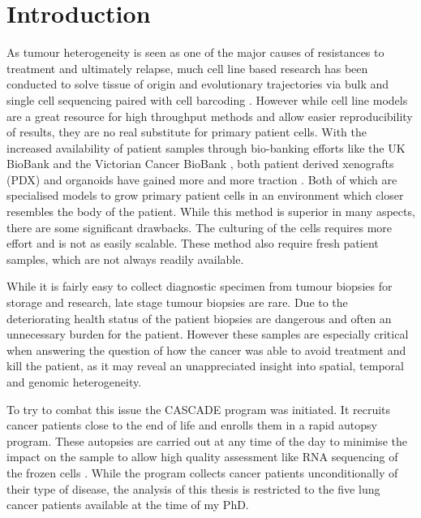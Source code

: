 \section{Introduction}
\label{cascade-sec:intro}

As tumour heterogeneity is seen as one of the major causes of resistances to treatment and ultimately relapse, much cell line based research has been conducted to solve tissue of origin and evolutionary trajectories via bulk and single cell sequencing paired with cell barcoding \cite{Fennell2021,Penter2022}. However while cell line models are a great resource for high throughput methods and allow easier reproducibility of results, they are no real substitute for primary patient cells. With the increased availability of patient samples through bio-banking efforts  like the UK BioBank \cite{Sudlow2015} and the Victorian Cancer BioBank \cite{CCV2006}, both patient derived xenografts (PDX) and organoids have gained more and more traction \cite{Yoshida2020}. Both of which are specialised models to grow primary patient cells in an environment which closer resembles the body of the patient. While this method is superior in many aspects, there are some significant drawbacks. The culturing of the cells requires more effort and is not as easily scalable. These method also require fresh patient samples, which are not always readily available.

While it is fairly easy to collect diagnostic specimen from tumour biopsies for storage and research, late stage tumour biopsies are rare. Due to the deteriorating health status of the patient biopsies are dangerous and often an unnecessary burden for the patient. However these samples are especially critical when answering the question of how the cancer was able to avoid treatment and kill the patient, as it may reveal an unappreciated insight into spatial, temporal and genomic heterogeneity.

To try to combat this issue the CASCADE program was initiated. It recruits cancer patients close to the end of life and enrolls them in a rapid autopsy program. These autopsies are carried out at any time of the day to minimise the impact on the sample to allow high quality assessment like RNA sequencing of the frozen cells \cite{Alsop2016}.
While the program collects cancer patients unconditionally of their type of disease, the analysis of this thesis is restricted to the five lung cancer patients available at the time of my PhD.

